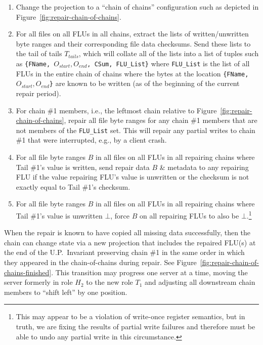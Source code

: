 \documentclass[preprint,10pt]{sigplanconf}
\begin{document}
\begin{enumerate}

\item Change the projection to a ``chain of chains'' configuration
  such as depicted in Figure~\ref{fig:repair-chain-of-chains}.

\item For all files on all FLUs in all chains, extract the lists of
  written/unwritten byte ranges and their corresponding file data
  checksums.
  Send these lists to the tail of tails
  $T_{tails}$, which will collate all of the lists into a list of
  tuples such as {\tt \{FName, $O_{start}, O_{end}$, CSum, FLU\_List\}}
  where {\tt FLU\_List} is the list of all FLUs in the entire chain of
  chains where the bytes at the location {\tt \{FName, $O_{start},
    O_{end}$\}} are known to be written (as of the
  beginning of the current repair period).

\item For chain \#1 members, i.e., the
  leftmost chain relative to Figure~\ref{fig:repair-chain-of-chains},
  repair all file byte ranges for any chain \#1 members that are not members
  of the {\tt FLU\_List} set.  This will repair any partial
  writes to chain \#1 that were interrupted, e.g., by a client crash.

\item For all file byte ranges $B$ in all files on all FLUs in all repairing
  chains where Tail \#1's value is written, send repair data $B$
  \& metadata to any repairing FLU if the value repairing FLU's
  value is unwritten or the checksum is not exactly equal to Tail \#1's
  checksum.

\item For all file byte ranges $B$ in all files on all FLUs in all
  repairing chains where Tail \#1's value is unwritten $\bot$, force
  $B$ on all repairing FLUs to also be $\bot$.\footnote{This may
    appear to be a violation of write-once register semantics, but in
    truth, we are fixing the results of partial write failures and
    therefore must be able to undo any partial write in this
    circumstance.}

\end{enumerate}

When the repair is known to have copied all missing data successfully,
then the chain can change state via a new projection that includes the
repaired FLU(s) at the end of the U.P.~Invariant preserving chain \#1
in the same order in which they appeared in the chain-of-chains during
repair.  See Figure~\ref{fig:repair-chain-of-chains-finished}.
This transition may progress one server at a time, moving the server
formerly in role $H_2$ to the new role $T_1$ and adjusting all
downstream chain members to ``shift left'' by one position.
\end{document}
